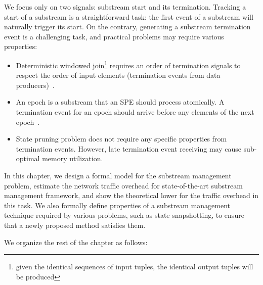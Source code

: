 We focus only on two signals: substream start and its termination. Tracking a start of a substream is a straightforward task: the first event of a substream will naturally trigger its start. On the contrary, generating a substream termination event is a challenging task, and practical problems may require various properties:
\begin{itemize}
    \item Deterministic windowed join\footnote{given the identical sequences of input tuples, the identical output tuples will be produced} requires an order of termination signals to respect the order of input elements (termination events from data producers)~\cite{najdataei2019stretch, gulisano2016scalejoin}.
    \item An epoch is a substream that an SPE should process atomically. A termination event for an epoch should arrive before any elements of the next epoch~\cite{2015arXiv150608603C}.
    \item State pruning problem does not require any specific properties from termination events. However, late termination event receiving may cause sub-optimal memory utilization.
\end{itemize}

In this chapter, we design a formal model for the substream management problem, estimate the network traffic overhead for state-of-the-art substream management framework, and show the theoretical lower for the traffic overhead in this task. We also formally define properties of a substream management technique required by various problems, such as state snapshotting, to ensure that a newly proposed method satisfies them. 

We organize the rest of the chapter as follows: 
